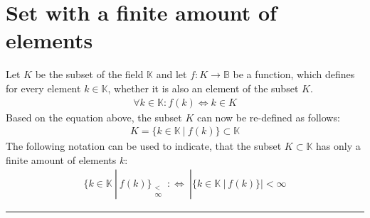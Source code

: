 \documentclass[pdftex,12pt,a4paper]{report}
\begin{document}
    \section{Set with a finite amount of elements}
    Let $ K $ be the subset of the field $ \mathbb{K} $ and let $ f : K \rightarrow \mathbb{B} $ be a function, which defines for every element $ k \in \mathbb{K} $, whether it is also an element of the subset $ K $.
    \begin{equation*}
        \begin{aligned}
            \forall k \in \mathbb{K} : f (k) \Leftrightarrow k \in K
        \end{aligned}
    \end{equation*}
    Based on the equation above, the subset $ K $ can now be re-defined as follows:
    \begin{equation*}
        \begin{aligned}
            K = \{ k \in \mathbb{K} \ |\ f (k) \} \subset \mathbb{K}
        \end{aligned}
    \end{equation*}
    The following notation can be used to indicate, that the subset $ K \subset \mathbb{K} $ has only a finite amount of elements $ k $:
    \begin{equation*}
        \begin{aligned}
            \{ k \in \mathbb{K} \ |\ f (k) \}_{\substack{ < \\ \infty }} \ :\Leftrightarrow \ | \{ k \in \mathbb{K} \ |\ f (k) \} | < \infty
        \end{aligned}
    \end{equation*}
    \vspace{5mm} \hrule \vspace{5mm}
\end{document}
